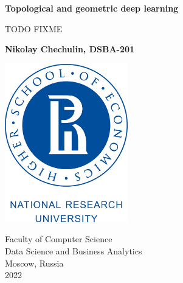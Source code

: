 \graphicspath{ {./assets/} }

\begin{titlepage}
   \begin{center}
        \vspace*{1cm}
        
        {\huge \textbf{Topological and geometric deep learning}}
        
        \vspace{0.5cm}
        {\large TODO FIXME }
        
        \vspace{1.5cm}
        
        {\large \textbf{Nikolay Chechulin, DSBA-201}}
        
        \vfill
        \vspace{1.5cm}
        
        \includegraphics[width=0.4\textwidth]{Higher_School_of_Economics_Logo}
        
        Faculty of Computer Science\\            
        Data Science and Business Analytics\\
        Moscow, Russia\\
        2022
            
   \end{center}
\end{titlepage}
